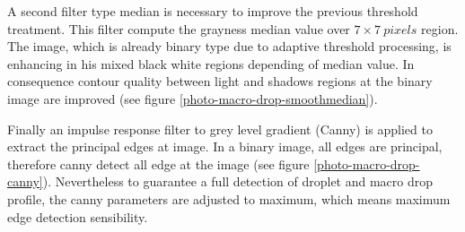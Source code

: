\documentclass[12pt]{iopart}
\begin{document}
A second filter type median is necessary to improve the previous threshold treatment. 
This filter compute the grayness median value over $7\times 7\ pixels$
region. The image, which is already binary type due to adaptive threshold processing,
 is enhancing in his mixed black white regions depending of 
 median value. In consequence contour quality between light and shadows
 regions at the binary image are improved (see figure \ref{photo-macro-drop-smoothmedian}).

Finally an impulse response filter to grey level gradient (Canny) is applied to extract 
the principal edges at image. In a binary image, all edges are principal,
therefore canny detect all edge at the image (see figure \ref{photo-macro-drop-canny}).
Nevertheless to guarantee a full detection of droplet and 
 macro drop profile, the canny parameters are adjusted to maximum, 
which means maximum edge detection sensibility. 
              
\end{document}
